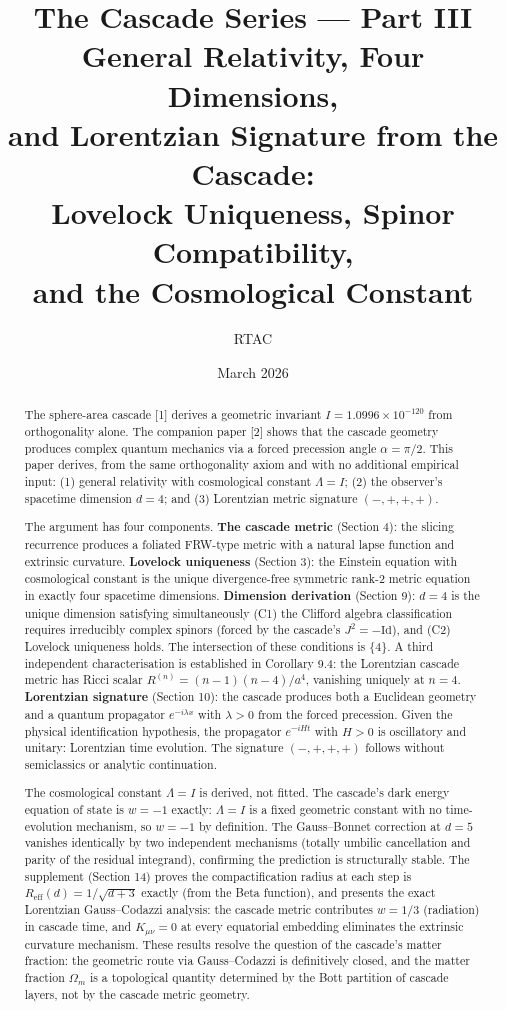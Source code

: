 \documentclass[12pt,a4paper]{article}
\title{\textbf{The Cascade Series --- Part III}\\[6pt]
General Relativity, Four Dimensions,\\
and Lorentzian Signature from the Cascade:\\
Lovelock Uniqueness, Spinor Compatibility,\\
and the Cosmological Constant}
\author{RTAC}
\date{March 2026}
\begin{document}
\maketitle

\begin{abstract}
The sphere-area cascade [1] derives a geometric invariant $I = 1.0996 \times 10^{-120}$
from orthogonality alone. The companion paper [2] shows that the cascade geometry
produces complex quantum mechanics via a forced precession angle $\alpha = \pi/2$. This
paper derives, from the same orthogonality axiom and with no additional empirical
input: (1) general relativity with cosmological constant $\Lambda = I$; (2) the observer's
spacetime dimension $d = 4$; and (3) Lorentzian metric signature $(-,+,+,+)$.

The argument has four components. \textbf{The cascade metric} (Section 4): the slicing
recurrence produces a foliated FRW-type metric with a natural lapse function and
extrinsic curvature. \textbf{Lovelock uniqueness} (Section 3): the Einstein equation with
cosmological constant is the unique divergence-free symmetric rank-2 metric equation
in exactly four spacetime dimensions. \textbf{Dimension derivation} (Section 9): $d = 4$ is the
unique dimension satisfying simultaneously (C1) the Clifford algebra classification
requires irreducibly complex spinors (forced by the cascade's $J^2 = -\text{Id}$), and (C2)
Lovelock uniqueness holds. The intersection of these conditions is $\{4\}$. A third
independent characterisation is established in Corollary 9.4: the Lorentzian cascade
metric has Ricci scalar $R^{(n)} = (n-1)(n-4)/a^4$, vanishing uniquely at $n = 4$.
\textbf{Lorentzian signature} (Section 10): the cascade produces both a Euclidean geometry
and a quantum propagator $e^{-i\lambda x}$ with $\lambda > 0$ from the forced precession. Given the
physical identification hypothesis, the propagator $e^{-iHt}$ with $H > 0$ is oscillatory
and unitary: Lorentzian time evolution. The signature $(-,+,+,+)$ follows without
semiclassics or analytic continuation.

The cosmological constant $\Lambda = I$ is derived, not fitted. The cascade's dark
energy equation of state is $w = -1$ exactly: $\Lambda = I$ is a fixed geometric constant
with no time-evolution mechanism, so $w = -1$ by definition. The Gauss--Bonnet
correction at $d = 5$ vanishes identically by two independent mechanisms (totally
umbilic cancellation and parity of the residual integrand), confirming the prediction is
structurally stable. The supplement (Section 14) proves the compactification radius
at each step is $R_{\text{eff}}(d) = 1/\sqrt{d + 3}$ exactly (from the Beta function), and presents the
exact Lorentzian Gauss--Codazzi analysis: the cascade metric contributes $w = 1/3$
(radiation) in cascade time, and $K_{\mu\nu} = 0$ at every equatorial embedding eliminates
the extrinsic curvature mechanism. These results resolve the question of the cascade's
matter fraction: the geometric route via Gauss--Codazzi is definitively closed, and
the matter fraction $\Omega_m$ is a topological quantity determined by the Bott partition of
cascade layers, not by the cascade metric geometry.
\end{abstract}
\end{document}
